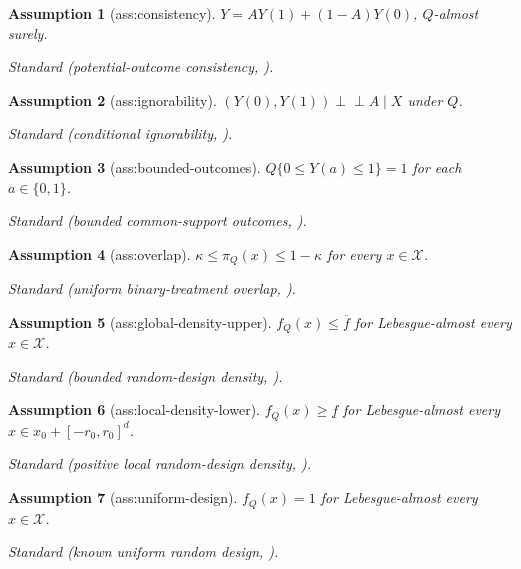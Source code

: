 \documentclass{article}
\newtheorem{assumption}{Assumption}
\begin{document}
\begin{assumption}[ass:consistency]\label{ass:consistency}
\(Y=A Y(1)+(1-A)Y(0)\), \(Q\)-almost surely.
\par\smallskip\noindent\emph{Standard} (potential-outcome consistency, \cite{RosenbaumRubin1983}).
\end{assumption}

\begin{assumption}[ass:ignorability]\label{ass:ignorability}
\((Y(0),Y(1))\mathbin{\perp\!\!\!\perp} A\mid X\) under \(Q\).
\par\smallskip\noindent\emph{Standard} (conditional ignorability, \cite{RosenbaumRubin1983}).
\end{assumption}

\begin{assumption}[ass:bounded-outcomes]\label{ass:bounded-outcomes}
\(Q\{0\le Y(a)\le 1\}=1\) for each \(a\in\{0,1\}\).
\par\smallskip\noindent\emph{Standard} (bounded common-support outcomes, \cite{KennedyBalakrishnanRobinsWasserman2024}).
\end{assumption}

\begin{assumption}[ass:overlap]\label{ass:overlap}
\(\kappa\le\pi_Q(x)\le 1-\kappa\) for every \(x\in\mathcal X\).
\par\smallskip\noindent\emph{Standard} (uniform binary-treatment overlap, \cite{KennedyBalakrishnanRobinsWasserman2024}).
\end{assumption}

\begin{assumption}[ass:global-density-upper]\label{ass:global-density-upper}
\(f_Q(x)\le\overline f\) for Lebesgue-almost every \(x\in\mathcal X\).
\par\smallskip\noindent\emph{Standard} (bounded random-design density, \cite{KennedyBalakrishnanRobinsWasserman2024}).
\end{assumption}

\begin{assumption}[ass:local-density-lower]\label{ass:local-density-lower}
\(f_Q(x)\ge\underline f\) for Lebesgue-almost every \(x\in x_0+[-r_0,r_0]^d\).
\par\smallskip\noindent\emph{Standard} (positive local random-design density, \cite{KennedyBalakrishnanRobinsWasserman2024}).
\end{assumption}

\begin{assumption}[ass:uniform-design]\label{ass:uniform-design}
\(f_Q(x)=1\) for Lebesgue-almost every \(x\in\mathcal X\).
\par\smallskip\noindent\emph{Standard} (known uniform random design, \cite{KennedyBalakrishnanRobinsWasserman2024}).
\end{assumption}
\end{document}
